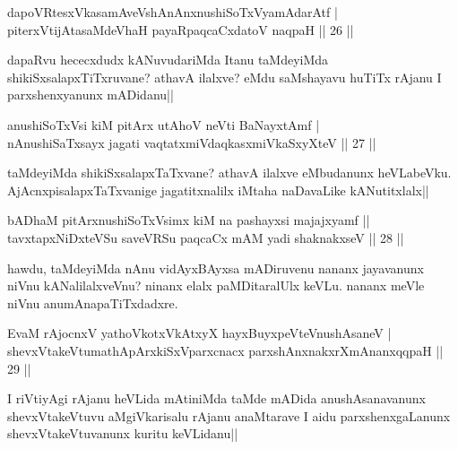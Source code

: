 
\begin{shl}
dapoVRtesxVkasamAveVshAnAnxnushiSoTxV\s yamAdarAtf | \\
piterxVtijAtasaMdeVhaH payaRpaqcaCxdatoV naqpaH \hfill|| 26 || 
\end{shl}

\begin{artha}
dapaRvu hececxdudx kANuvudariMda Itanu taMdeyiMda 
shikiSxsalapxTiTxruvane? athavA ilalxve? eMdu saMshayavu huTiTx rAjanu 
I parxshenxyanunx mADidanu||
\end{artha}

\begin{shl}
anushiSoTxV\s si kiM pitArx utAhoV neVti BaNayxtAmf | \\
nAnushiSaTxsayx jagati vaqtatxmiVdaqkasxmiVkaSxyXteV \hfill|| 27 || 
\end{shl}

\begin{artha}
taMdeyiMda shikiSxsalapxTaTxvane? athavA ilalxve eMbudanunx 
heVLabeVku. AjAcnxpisalapxTaTxvanige jagatitxnalilx iMtaha naDavaLike 
kANutitxlalx||
\end{artha}


\begin{shl}
bADhaM pitArx\s nushiSoTxV\s simx kiM na pashayxsi majajxyamf || \\
tavxtapxNiDxteVSu saveVRSu paqcaCx mAM yadi shaknakxseV \hfill|| 28 || 
\end{shl}

\begin{artha}
hawdu, taMdeyiMda nAnu vidAyxBAyxsa mADiruvenu nananx jayavanunx niVnu 
kANalilalxveVnu? ninanx elalx paMDitaralUlx keVLu. nananx meVle niVnu 
anumAnapaTiTxdadxre.
\end{artha}

\begin{shl}
EvaM rAjocnxV yathoVkotxVkAtxyX hayxBuyxpeVteV\s nushAsaneV | \\
shevxVtakeVtumathApArxkiSxVparxcnacx parxshAnxnakxrXmAnanxqqpaH \hfill|| 29 || 
\end{shl}

\begin{artha}
I riVtiyAgi rAjanu heVLida mAtiniMda taMde mADida anushAsanavanunx 
shevxVtakeVtuvu aMgiVkarisalu rAjanu anaMtarave I aidu 
parxshenxgaLanunx shevxVtakeVtuvanunx kuritu keVLidanu||
\end{artha}

